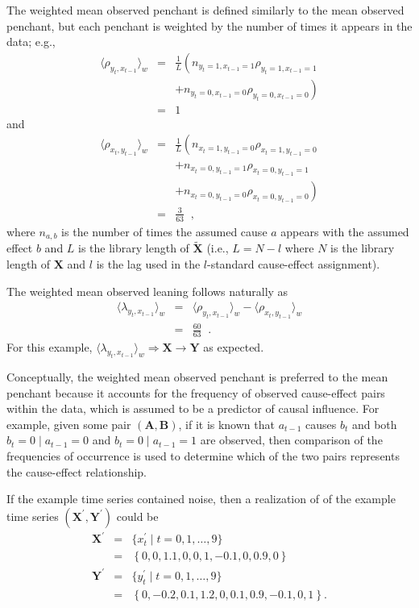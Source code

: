 The weighted mean observed penchant is defined similarly to the mean observed penchant, but each penchant is weighted by the number of times it appears in the data; e.g.,\
\begin{eqnarray*}
\langle \rho_{y_t,x_{t-1}} \rangle_w &=& \frac{1}{L}\left(n_{y_t=1,x_{t-1}=1}\rho_{y_t=1,x_{t-1}=1} \right.\\
& & \left.+ n_{y_t=0,x_{t-1}=0}\rho_{y_t=0,x_{t-1}=0}\right)\\
&=& 1
\end{eqnarray*}
and
\begin{eqnarray*}
\langle \rho_{x_t,y_{t-1}} \rangle_w &=& \frac{1}{L}\left(n_{x_t=1,y_{t-1}=0}\rho_{x_t=1,y_{t-1}=0} \right.\\
& & +n_{x_t=0,y_{t-1}=1}\rho_{x_t=0,y_{t-1}=1}\\
& & \left.+ n_{x_t=0,y_{t-1}=0}\rho_{x_t=0,y_{t-1}=0}\right)\\
&=& \frac{3}{63}\;\;,
\end{eqnarray*}
where $n_{a,b}$ is the number of times the assumed cause $a$ appears with the assumed effect $b$ and $L$ is the library length of $\tilde{\mathbf{X}}$ (i.e., $L=N-l$ where $N$ is the library length of $\mathbf{X}$ and $l$ is the lag used in the $l$-standard cause-effect assignment).  

The weighted mean observed leaning follows naturally as
\begin{eqnarray*}
\langle \lambda_{y_t,x_{t-1}} \rangle_w &=& \langle \rho_{y_t,x_{t-1}} \rangle_w - \langle \rho_{x_t,y_{t-1}} \rangle_w\\
&=& \frac{60}{63}\;\;.
\end{eqnarray*}
For this example, $\langle \lambda_{y_t,x_{t-1}} \rangle_w\Rightarrow \mathbf{X}\rightarrow\mathbf{Y}$ as expected.

Conceptually, the weighted mean observed penchant is preferred to the mean penchant because it accounts for the frequency of observed cause-effect pairs within the data, which is assumed to be a predictor of causal influence.  For example, given some pair $(\mathbf{A},\mathbf{B})$, if it is known that $a_{t-1}$ causes $b_{t}$ and both $b_t = 0\; |\; a_{t-1} = 0$ and $b_t = 0\; |\; a_{t-1} = 1$ are observed, then comparison of the frequencies of occurrence is used to determine which of the two pairs represents the cause-effect relationship.

If the example time series contained noise, then a realization of of the example time series $(\mathbf{X}^\prime,\mathbf{Y}^\prime)$ could be
\begin{eqnarray*}
\mathbf{X}^\prime &=& \{x_t^\prime\; | \; t=0,1,\ldots,9\}\\
&=& \left\{0,0,1.1,0,0,1,-0.1,0,0.9,0\right\}\\
\mathbf{Y}^\prime &=& \{y_t^\prime\; | \; t=0,1,\ldots,9\}\\
&=& \left\{0,-0.2,0.1,1.2,0,0.1,0.9,-0.1,0,1\right\}.
\end{eqnarray*}

